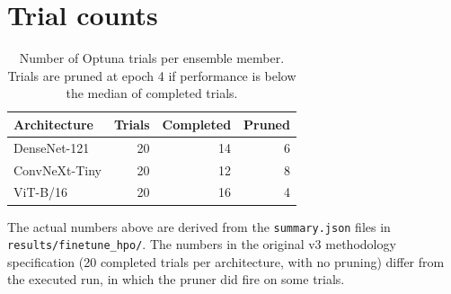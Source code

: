 \documentclass[../preamble.tex]{subfiles}
\begin{document}


\section{Trial counts}
\label{app:hpo-trial-counts}

\begin{table}[htbp]
  \centering
  \small
  \caption{Number of Optuna trials per ensemble member. Trials are pruned at
           epoch 4 if performance is below the median of completed trials.}
  \label{tab:hpo-trials}
  \begin{tabular}{lrrr}
    \toprule
    \textbf{Architecture} & \textbf{Trials} & \textbf{Completed} & \textbf{Pruned} \\
    \midrule
    DenseNet-121   & 20 & 14 & 6 \\
    ConvNeXt-Tiny  & 20 & 12 & 8 \\
    ViT-B/16       & 20 & 16 & 4 \\
    \bottomrule
  \end{tabular}
\end{table}

The actual numbers above are derived from the \texttt{summary.json} files in
\texttt{results/finetune\_hpo/}. The numbers in the original v3 methodology
specification (20 completed trials per architecture, with no pruning)
differ from the executed run, in which the pruner did fire on some trials.
\end{document}
